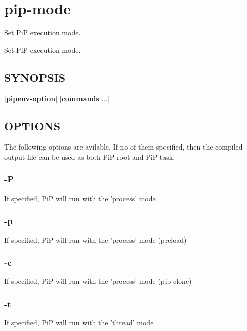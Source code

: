 \hypertarget{group__pip-mode}{\section{pip-\/mode}
\label{group__pip-mode}
}


Set Pi\-P execution mode.  


Set Pi\-P execution mode. \hypertarget{group__piplnlibs_synopsis}{}\subsection{S\-Y\-N\-O\-P\-S\-I\-S}\label{group__piplnlibs_synopsis}
{ }\mbox{[}{\bfseries pipenv-\/option}\mbox{]} \mbox{[}{\bfseries commands} ...\mbox{]}\hypertarget{group__piplnlibs_options}{}\subsection{O\-P\-T\-I\-O\-N\-S}\label{group__piplnlibs_options}
The following options are avilable. If no of them specified, then the compiled output file can be used as both Pi\-P root and Pi\-P task.\hypertarget{group__pip-mode_process}{}\subsubsection{-\/\-P}\label{group__pip-mode_process}
If specified, Pi\-P will run with the 'process' mode\hypertarget{group__pip-mode_preload}{}\subsubsection{-\/p}\label{group__pip-mode_preload}
If specified, Pi\-P will run with the 'process' mode (preload)\hypertarget{group__pip-mode_pipclone}{}\subsubsection{-\/c}\label{group__pip-mode_pipclone}
If specified, Pi\-P will run with the 'process' mode (pip clone)\hypertarget{group__pip-mode_pthread}{}\subsubsection{-\/t}\label{group__pip-mode_pthread}
If specified, Pi\-P will run with the 'thread' mode 